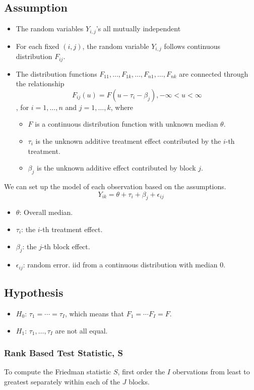 \subsection{Assumption}
\begin{itemize}
	\item The random variables $Y_{i,j}$'s all mutually independent
	\item For each fixed $(i, j)$, the random variable $Y_{i,j}$ follows continuous distribution $F_{ij}$.
	\item The distribution functions $F_{11}, \dots, F_{1k}, \dots, F_{n1}, \dots, F_{nk}$ are connected through the relationship
	\[F_{ij}(u) = F(u - \tau_i - \beta_j ), -\infty < u < \infty\]
	, for $i = 1, \dots, n$ and $j = 1, \dots, k$, where
	\begin{itemize}
		\item $F$ is a continuous distribution function with unknown median $\theta$.
		\item $\tau_i$ is the unknown additive treatment effect contributed by the $i$-th treatment.
		\item $\beta_j$ is the unknown additive effect contributed by block $j$.
	\end{itemize}
\end{itemize}

We can set up the model of each observation based on the assumptions.
\[Y_{ik} = \theta + \tau_i + \beta_j + \epsilon_{ij}\]
\begin{itemize}
	\item $\theta$: Overall median.
	\item $\tau_i$: the $i$-th treatment effect.
	\item $\beta_j$: the $j$-th block effect.
	\item $\epsilon_{ij}$: random error. iid from a continuous distribution with median 0.
\end{itemize}
\subsection{Hypothesis}
\begin{itemize}
	\item $H_0$: $\tau_1 = \cdots = \tau_I$, which means that $F_1 = \cdots F_I = F$.
	\item $H_1$: $\tau_1, \dots, \tau_I$ are not all equal.
\end{itemize}
\subsubsection{Rank Based Test Statistic, S}
To compute the Friedman statistic $S$, first order the  $I$ obervations from least to greatest separately within each of the $J$ blocks.

